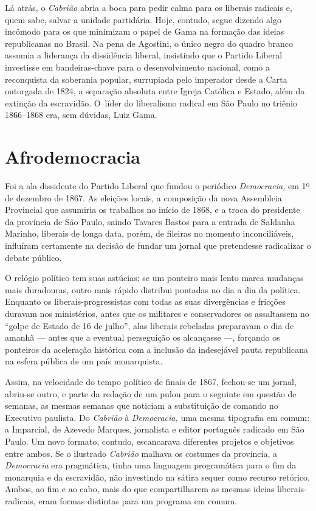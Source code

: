 Lá atrás, o \emph{Cabrião} abria a boca para pedir calma para os
liberais radicais e, quem sabe, salvar a unidade partidária. Hoje,
contudo, segue dizendo algo incômodo para os que minimizam o papel de
Gama na formação das ideias republicanas no Brasil. Na pena de Agostini,
o único negro do quadro branco assumia a liderança da dissidência
liberal, insistindo que o Partido Liberal investisse em bandeiras-chave
para o desenvolvimento nacional, como a reconquista da soberania
popular, surrupiada pelo imperador desde a Carta outorgada de 1824, a
separação absoluta entre Igreja Católica e Estado, além da extinção da
escravidão. O~líder do liberalismo radical em São Paulo no triênio
1866--1868 era, sem dúvidas, Luiz Gama.

\section{Afrodemocracia}

Foi a ala dissidente do Partido Liberal que fundou o periódico
\emph{Democracia,} em 1º de dezembro de 1867. As eleições locais, a
composição da nova Assembleia Provincial que assumiria os trabalhos no
início de 1868, e a troca do presidente da província de São Paulo,
saindo Tavares Bastos para a entrada de Saldanha Marinho, liberais de
longa data, porém, de fileiras no momento inconciliáveis, influíram
certamente na decisão de fundar um jornal que pretendesse radicalizar o
debate público.

O relógio político tem suas astúcias: se um ponteiro mais lento marca
mudanças mais duradouras, outro mais rápido distribui pontadas no
dia a dia da política. Enquanto os liberais-progressistas com todas as
suas divergências e fricções duravam nos ministérios, antes que os
militares e conservadores os assaltassem no ``golpe de Estado de 16 de
julho'', alas liberais rebeladas preparavam o dia de amanhã --- antes que
a eventual perseguição os alcançasse ---, forçando os ponteiros da
aceleração histórica com a inclusão da indesejável pauta republicana na
esfera pública de um país monarquista.

Assim, na velocidade do tempo político de finais de 1867, fechou-se um
jornal, abriu-se outro, e parte da redação de um pulou para o seguinte
em questão de semanas, as mesmas semanas que noticiam a substituição de
comando no Executivo paulista. Do \emph{Cabrião} à \emph{Democracia,}
uma mesma tipografia em comum: a Imparcial, de Azevedo Marques,
jornalista e editor português radicado em São Paulo. Um novo formato,
contudo, escancarava diferentes projetos e objetivos entre ambos. Se o
ilustrado \emph{Cabrião} malhava os costumes da província, a
\emph{Democracia} era pragmática, tinha uma linguagem programática para
o fim da monarquia e da escravidão, não investindo na sátira
sequer como recurso retórico. Ambos, ao fim e ao cabo, mais do
que compartilharem as mesmas ideias liberais-radicais, eram formas
distintas para um programa em comum.

